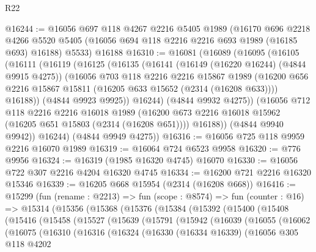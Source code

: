 \begin{lexlean}{R22}
\begin{coremodule}
@16244 := @16056
    @697
    @118
    @4267
    @2216
    @5405
    @1989
    (@16170
      @696
      @2218
      @4266
      @5520
      @5405
      (@16056 @694 @118 @2216 @2216 @693 @1989 (@16185 @693) @16188)
      @5533)
    @16188
@16310 := @16081
    (@16089
      (@16095
        (@16105
          (@16111
            (@16119
              (@16125
                (@16135
                  (@16141
                    (@16149 (@16220 @16244) (@4844 @9915 @4275))
                    (@16056
                      @703
                      @118
                      @2216
                      @2216
                      @15867
                      @1989
                      (@16200 @656 @2216 @15867 @15811 (@16205 @633 @15652 (@2314 (@16208 @633))))
                      @16188))
                  (@4844 @9923 @9925))
                @16244)
              (@4844 @9932 @4275))
            (@16056
              @712
              @118
              @2216
              @2216
              @16018
              @1989
              (@16200 @673 @2216 @16018 @15962 (@16205 @651 @15803 (@2314 (@16208 @651))))
              @16188))
          (@4844 @9940 @9942))
        @16244)
      (@4844 @9949 @4275))
@16316 := @16056 @725 @118 @9959 @2216 @16070 @1989
@16319 := @16064 @724 @6523 @9958
@16320 := @776 @9956
@16324 := @16319 (@1985 @16320 @4745) @16070
@16330 := @16056 @722 @307 @2216 @4204 @16320 @4745
@16334 := @16200 @721 @2216 @16320 @15346
@16339 := @16205 @668 @15954 (@2314 (@16208 @668))
@16416 := @15299
    (fun (rename : @2213) =>
    fun (scope : @8574) =>
    fun (counter : @16) =>
    @15314
      (@15356
        (@15368
          (@15376
            (@15384
              (@15392
                (@15400
                  (@15408
                    (@15416
                      (@15458
                        (@15527
                          (@15639
                            (@15791
                              (@15942
                                (@16039
                                  (@16055
                                    (@16062
                                      (@16075
                                        (@16310
                                          (@16316
                                            (@16324
                                              (@16330
                                                (@16334 @16339)
                                                (@16056
                                                  @305
                                                  @118
                                                  @4202

\end{coremodule}
\end{lexlean}
